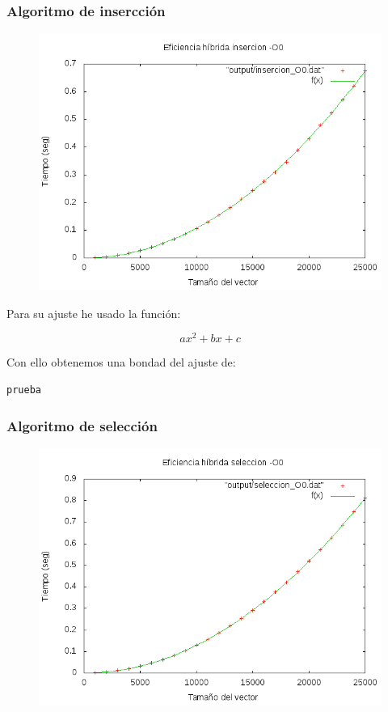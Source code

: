 \documentclass[spanish]{beamer}
\begin{document}
\begin{frame}\frametitle{Algoritmo de insercción}
  \begin{figure}[H]
    \centering   
        \includegraphics[clip,width=1\columnwidth]{../../plots/insercion_O0_fit.png}%
    \end{figure}
  \end{frame}

\begin{frame}[fragile]
  Para su ajuste he usado la función:

  $$ax^2+bx+c$$

  Con ello obtenemos una bondad del ajuste de:
  
\begin{verbatim}
prueba
\end{verbatim}
  
\end{frame}

%
%

\begin{frame}\frametitle{Algoritmo de selección}
  \begin{figure}[H]
    \centering   
        \includegraphics[clip,width=1\columnwidth]{../../plots/seleccion_O0_fit.png}%
    \end{figure}
  \end{frame}
\end{document}
